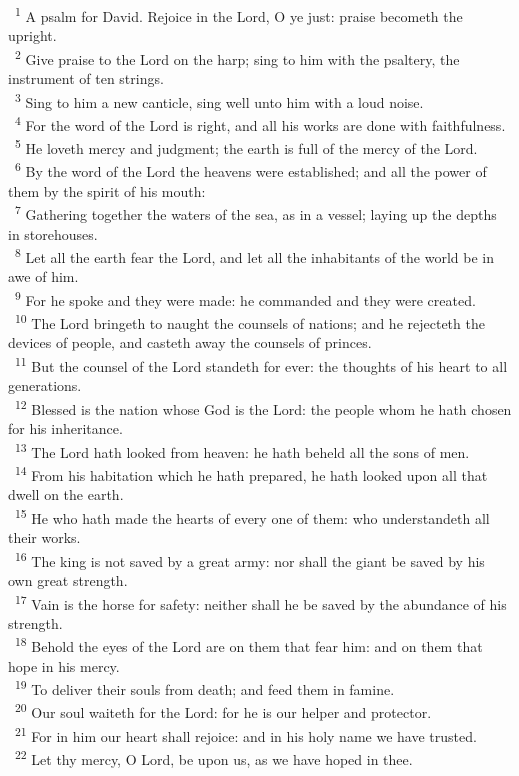 \documentclass[a5paper,12pt]{article}
\begin{document}
\begin{multicols*}{2}
~\textsuperscript{1} A psalm for David. Rejoice in the Lord, O ye just: praise becometh the upright.\\
~\textsuperscript{2} Give praise to the Lord on the harp; sing to him with the psaltery, the instrument of ten strings.\\
~\textsuperscript{3} Sing to him a new canticle, sing well unto him with a loud noise.\\
~\textsuperscript{4} For the word of the Lord is right, and all his works are done with faithfulness.\\
~\textsuperscript{5} He loveth mercy and judgment; the earth is full of the mercy of the Lord.\\
~\textsuperscript{6} By the word of the Lord the heavens were established; and all the power of them by the spirit of his mouth:\\
~\textsuperscript{7} Gathering together the waters of the sea, as in a vessel; laying up the depths in storehouses.\\
~\textsuperscript{8} Let all the earth fear the Lord, and let all the inhabitants of the world be in awe of him.\\
~\textsuperscript{9} For he spoke and they were made: he commanded and they were created.\\
~\textsuperscript{10} The Lord bringeth to naught the counsels of nations; and he rejecteth the devices of people, and casteth away the counsels of princes.\\
~\textsuperscript{11} But the counsel of the Lord standeth for ever: the thoughts of his heart to all generations.\\
~\textsuperscript{12} Blessed is the nation whose God is the Lord: the people whom he hath chosen for his inheritance.\\
~\textsuperscript{13} The Lord hath looked from heaven: he hath beheld all the sons of men.\\
~\textsuperscript{14} From his habitation which he hath prepared, he hath looked upon all that dwell on the earth.\\
~\textsuperscript{15} He who hath made the hearts of every one of them: who understandeth all their works.\\
~\textsuperscript{16} The king is not saved by a great army: nor shall the giant be saved by his own great strength.\\
~\textsuperscript{17} Vain is the horse for safety: neither shall he be saved by the abundance of his strength.\\
~\textsuperscript{18} Behold the eyes of the Lord are on them that fear him: and on them that hope in his mercy.\\
~\textsuperscript{19} To deliver their souls from death; and feed them in famine.\\
~\textsuperscript{20} Our soul waiteth for the Lord: for he is our helper and protector.\\
~\textsuperscript{21} For in him our heart shall rejoice: and in his holy name we have trusted.\\
~\textsuperscript{22} Let thy mercy, O Lord, be upon us, as we have hoped in thee.\\


\end{multicols*}
\end{document}

